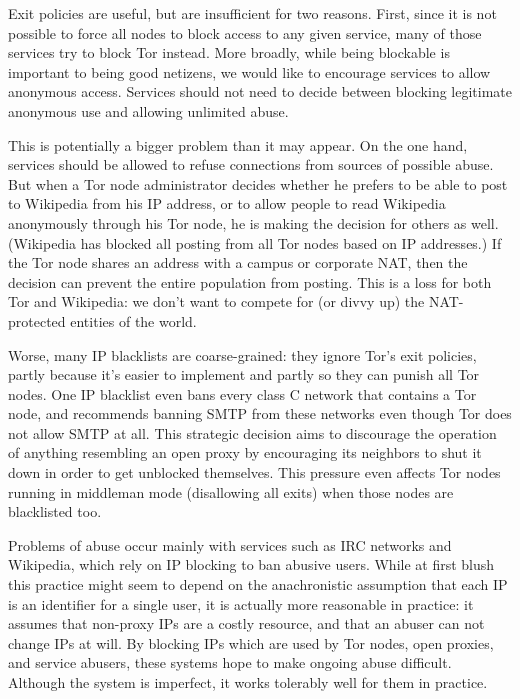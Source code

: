 \documentclass{llncs}
\begin{document}
Exit policies are useful, but are insufficient for two reasons.  First, since
it is not possible to force all nodes to block access to any given service,
many of those services try to block Tor instead.  More broadly, while being
blockable is important to being good netizens, we would like to encourage
services to allow anonymous access. Services should not need to decide
between blocking legitimate anonymous use and allowing unlimited abuse.

This is potentially a bigger problem than it may appear.
On the one hand, services should be allowed to refuse connections from
sources of possible abuse.
But when a Tor node administrator decides whether he prefers to be able
to post to Wikipedia from his IP address, or to allow people to read
Wikipedia anonymously through his Tor node, he is making the decision
for others as well. (Wikipedia
has blocked all posting from all Tor nodes based on IP addresses.) If
the Tor node shares an address with a campus or corporate NAT,
then the decision can prevent the entire population from posting.
This is a loss for both Tor
and Wikipedia: we don't want to compete for (or divvy up) the
NAT-protected entities of the world.

Worse, many IP blacklists are coarse-grained: they ignore Tor's exit
policies, partly because it's easier to implement and partly
so they can punish
all Tor nodes. One IP blacklist even bans
every class C network that contains a Tor node, and recommends banning SMTP
from these networks even though Tor does not allow SMTP at all.  This
strategic decision aims to discourage the
operation of anything resembling an open proxy by encouraging its neighbors
to shut it down in order to get unblocked themselves. This pressure even
affects Tor nodes running in middleman mode (disallowing all exits) when
those nodes are blacklisted too.

Problems of abuse occur mainly with services such as IRC networks and
Wikipedia, which rely on IP blocking to ban abusive users.  While at first
blush this practice might seem to depend on the anachronistic assumption that
each IP is an identifier for a single user, it is actually more reasonable in
practice: it assumes that non-proxy IPs are a costly resource, and that an
abuser can not change IPs at will.  By blocking IPs which are used by Tor
nodes, open proxies, and service abusers, these systems hope to make
ongoing abuse difficult.  Although the system is imperfect, it works
tolerably well for them in practice.
\end{document}
